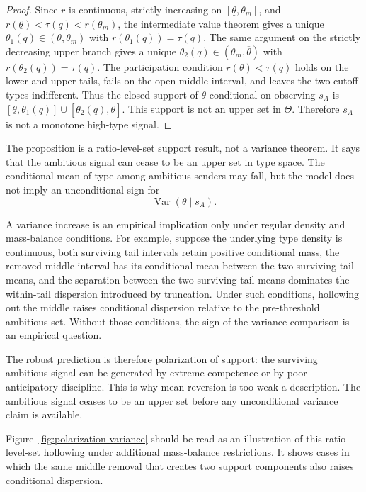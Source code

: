 \begin{proof}
Since \(r\) is continuous, strictly increasing on \([\underline\theta,\theta_m]\), and \(r(\underline\theta)<\tau(q)<r(\theta_m)\), the intermediate value theorem gives a unique \(\theta_1(q)\in(\underline\theta,\theta_m)\) with \(r(\theta_1(q))=\tau(q)\). The same argument on the strictly decreasing upper branch gives a unique \(\theta_2(q)\in(\theta_m,\overline\theta)\) with \(r(\theta_2(q))=\tau(q)\). The participation condition \(r(\theta)<\tau(q)\) holds on the lower and upper tails, fails on the open middle interval, and leaves the two cutoff types indifferent. Thus the closed support of \(\theta\) conditional on observing \(s_A\) is \([\underline\theta,\theta_1(q)]\cup[\theta_2(q),\overline\theta]\). This support is not an upper set in \(\Theta\). Therefore \(s_A\) is not a monotone high-type signal.
\end{proof}

The proposition is a ratio-level-set support result, not a variance theorem. It says that the ambitious signal can cease to be an upper set in type space. The conditional mean of type among ambitious senders may fall, but the model does not imply an unconditional sign for
\[
\operatorname{Var}(\theta\mid s_A).
\]

A variance increase is an empirical implication only under regular density and mass-balance conditions. For example, suppose the underlying type density is continuous, both surviving tail intervals retain positive conditional mass, the removed middle interval has its conditional mean between the two surviving tail means, and the separation between the two surviving tail means dominates the within-tail dispersion introduced by truncation. Under such conditions, hollowing out the middle raises conditional dispersion relative to the pre-threshold ambitious set. Without those conditions, the sign of the variance comparison is an empirical question.

The robust prediction is therefore polarization of support: the surviving ambitious signal can be generated by extreme competence or by poor anticipatory discipline. This is why mean reversion is too weak a description. The ambitious signal ceases to be an upper set before any unconditional variance claim is available.

Figure~\ref{fig:polarization-variance} should be read as an illustration of this ratio-level-set hollowing under additional mass-balance restrictions. It shows cases in which the same middle removal that creates two support components also raises conditional dispersion.

